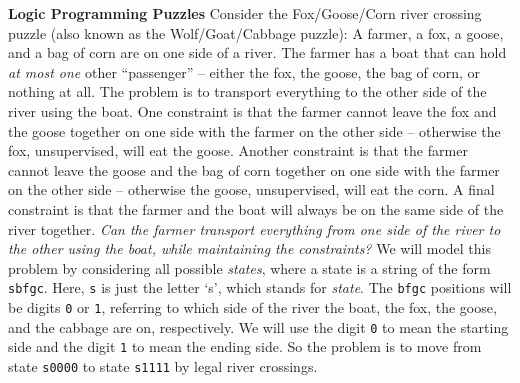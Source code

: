 \begin{minipage}[t]{\sw}
\slidenumber
\LARGE
{\bf Logic Programming Puzzles}\exx
Consider the Fox/Goose/Corn river crossing puzzle
(also known as the Wolf/Goat/Cabbage puzzle):\exx
A farmer, a fox, a goose, and a bag of corn are
on one side of a river.
The farmer has a boat that can hold {\em at most one} other ``passenger'' --
either the fox, the goose, the bag of corn, or nothing at all.
The problem is to transport everything
to the other side of the river using the boat.
One constraint is that the farmer cannot
leave the fox and the goose together on one side
with the farmer on the other side --
otherwise the fox, unsupervised, will eat the goose.
Another constraint is that the farmer cannot
leave the goose and the bag of corn together on one side
with the farmer on the other side --
otherwise the goose, unsupervised, will eat the corn.
A final constraint is that the farmer and the boat
will always be on the same side of the river together.
{\em Can the farmer transport everything
from one side of the river to the other
using the boat, while maintaining the constraints?}\exx
We will model this problem by considering all possible {\em states},
where a state is a string of the form \verb'sbfgc'.
Here, \verb's' is just the letter `s',
which stands for {\em state}.
The \verb'bfgc' positions will be digits \verb'0' or \verb'1',
referring to which side of the river the boat,
the fox, the goose, and the cabbage are on, respectively.
We will use the digit \verb'0' to mean the starting side
and the digit \verb'1' to mean the ending side.
So the problem is to move from state \verb's0000' to state \verb's1111'
by legal river crossings.\exx
\end{minipage}
